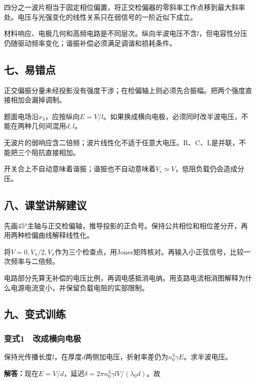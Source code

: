\documentclass[12pt,a4paper,fontset=fandol]{ctexart}
\begin{document}
四分之一波片相当于固定相位偏置，将正交检偏器的零斜率工作点移到最大斜率处。电压与光强变化的线性关系只在弱信号的一阶近似下成立。

材料响应、电极几何和高频电路是不同层次。纵向半波电压不含\(l\)，但电容性分压仍随驱动频率变化；谐振补偿必须满足调谐和损耗条件。

\subsection{七、易错点}\label{ux4e03ux6613ux9519ux70b9-7}

正交偏振分量未经投影没有强度干涉；在检偏轴上则必须先合振幅。把两个强度直接相加会漏掉调制。

题面电场沿\(x_3\)，应按纵向\(E=V/l\)。如果换成横向电极，必须同时改半波电压，不能在两种几何间混用\(d,l\)。

无波片的弱响应含二倍频；波片线性化不适于任意大电压。R、C、L是并联，不能把三个阻抗直接相加。

开关合上不自动意味着谐振；谐振也不自动意味着\(V_c\simeq V\)，低阻负载仍会造成分压。

\subsection{八、课堂讲解建议}\label{ux516bux8bfeux5802ux8bb2ux89e3ux5efaux8bae-7}

先画45°主轴与正交检偏轴，推导投影的正负号。保持公共相位和相位差分开，再用两种检偏曲线解释线性化。

将\(V=0,V_\pi/2,V_\pi\)作为三个检查点，用Jones矩阵核对。再输入小正弦信号，比较一次频率与二倍频。

电路部分先算无补偿的电压比例，再调电感抵消电纳。用支路电流相消图解释为什么电源电流变小，并保留负载电阻的实部限制。

\subsection{九、变式训练}\label{ux4e5dux53d8ux5f0fux8badux7ec3-7}

\subsubsection{变式1　改成横向电极}\label{ux53d8ux5f0f1-ux6539ux6210ux6a2aux5411ux7535ux6781}

保持光传播长度\(l\)，在厚度\(d\)两侧加电压，折射率差仍为\(n_0^3\gamma E\)。求半波电压。

\textbf{解答：}现在\(E=V/d\)，延迟\(\delta=2\pi n_0^3\gamma lV/(\lambda_0d)\)。故
\end{document}
